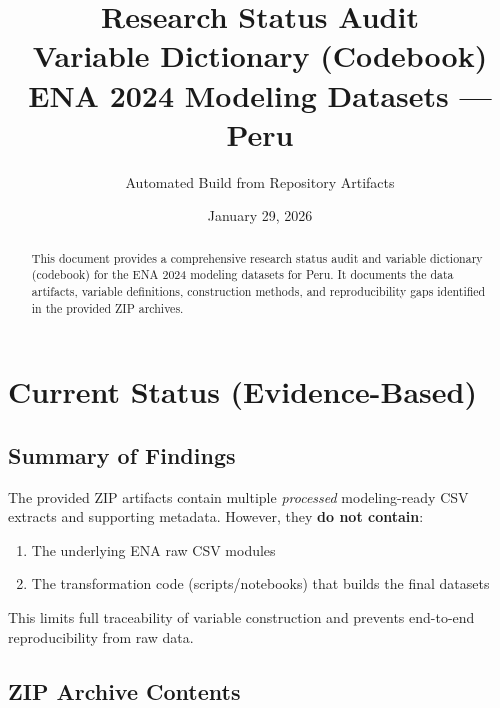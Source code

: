 \documentclass[11pt,a4paper]{article}
\title{%
    \vspace{-1cm}
    \textbf{\LARGE Research Status Audit}\\[0.3em]
    \textbf{\Large Variable Dictionary (Codebook)}\\[0.5em]
    \large ENA 2024 Modeling Datasets --- Peru
}
\author{Automated Build from Repository Artifacts}
\date{January 29, 2026}
\begin{document}
\maketitle
\thispagestyle{fancy}

\begin{abstract}
\noindent
This document provides a comprehensive research status audit and variable dictionary (codebook) for the ENA 2024 modeling datasets for Peru. It documents the data artifacts, variable definitions, construction methods, and reproducibility gaps identified in the provided ZIP archives.
\end{abstract}

\tableofcontents
\newpage

\section{Current Status (Evidence-Based)}

\subsection{Summary of Findings}

The provided ZIP artifacts contain multiple \emph{processed} modeling-ready CSV extracts and supporting metadata. However, they \textbf{do not contain}:
\begin{enumerate}
    \item The underlying ENA raw CSV modules
    \item The transformation code (scripts/notebooks) that builds the final datasets
\end{enumerate}

This limits full traceability of variable construction and prevents end-to-end reproducibility from raw data.

\subsection{ZIP Archive Contents}
\end{document}
